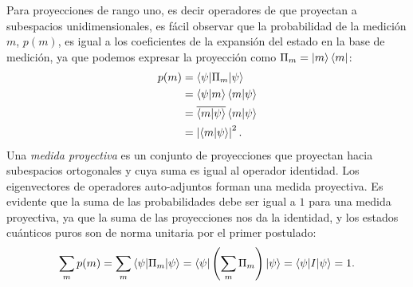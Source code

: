 \documentclass[a4paper]{report}
\begin{document}
  Para proyecciones de rango uno, es decir operadores de que
  proyectan a subespacios unidimensionales, es fácil
  observar que la probabilidad de la medición $m$, $p(m)$,
  es igual a los coeficientes de la expansión del estado
  en la base de medición, ya que podemos expresar la
  proyección como $\Pi_m = \ket m \bra m$:
  \begin{align}
    p(m)
    &= \braket{\psi|\Pi_m|\psi} \\
    &= \braket{\psi|m} \braket{m|\psi} \\
    &= \overline{\braket{m|\psi}} \braket{m|\psi} \\
    &= \left|\langle m|\psi \rangle\right|^2.
  \end{align}
  Una \textit{medida proyectiva} es un conjunto de
  proyecciones que proyectan hacia subespacios ortogonales y
  cuya suma es igual al operador identidad. Los
  eigenvectores de operadores auto-adjuntos forman una
  medida proyectiva.  Es evidente que la suma de las
  probabilidades debe ser igual a $1$ para una medida
  proyectiva, ya que la suma de las proyecciones nos da la
  identidad, y los estados cuánticos puros son de norma
  unitaria por el primer postulado:
  \begin{equation}
    \sum_{m}^{} p(m)
    = \sum_{m}^{} \braket{\psi|\Pi_m|\psi}
    = \braket{\psi|\left( \sum_{m}^{} \Pi_m \right)|\psi}
    = \braket{\psi|I|\psi}
    = 1.
  \end{equation}
\end{document}
